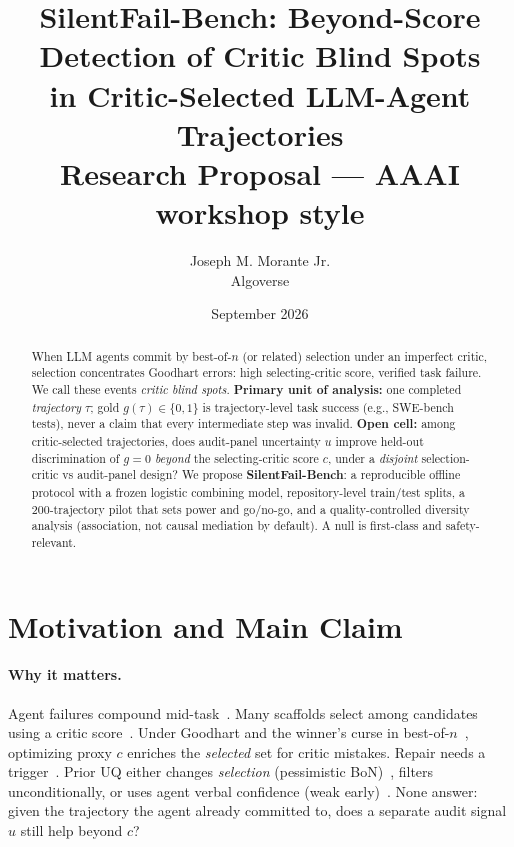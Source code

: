 \documentclass[11pt]{article}
\title{\textbf{SilentFail-Bench: Beyond-Score Detection of Critic Blind Spots\\[-2pt]
in Critic-Selected LLM-Agent Trajectories}\\[4pt]
\large Research Proposal --- AAAI workshop style}
\author{Joseph M. Morante Jr.\\Algoverse}
\date{September 2026}
\newcommand{\gzero}{g{=}0}
\begin{document}
\maketitle
\vspace{-1em}

\begin{abstract}
\noindent
When LLM agents commit by best-of-$n$ (or related) selection under an imperfect critic, selection concentrates Goodhart errors: high selecting-critic score, verified task failure.
We call these events \emph{critic blind spots}.
\textbf{Primary unit of analysis:} one completed \emph{trajectory} $\tau$; gold $g(\tau)\in\{0,1\}$ is trajectory-level task success (e.g., SWE-bench tests), never a claim that every intermediate step was invalid.
\textbf{Open cell:} among critic-selected trajectories, does audit-panel uncertainty $u$ improve held-out discrimination of $\gzero$ \emph{beyond} the selecting-critic score $c$, under a \emph{disjoint} selection-critic vs audit-panel design?
We propose \textbf{SilentFail-Bench}: a reproducible offline protocol with a frozen logistic combining model, repository-level train/test splits, a 200-trajectory pilot that sets power and go/no-go, and a quality-controlled diversity analysis (association, not causal mediation by default).
A null is first-class and safety-relevant.
\end{abstract}

\section{Motivation and Main Claim}

\paragraph{Why it matters.}
Agent failures compound mid-task~\cite{agentforesight,detectrepair,falsesuccess}.
Many scaffolds select among candidates using a critic score~\cite{lightman,mathshepherd,agentprm}.
Under Goodhart and the winner's curse in best-of-$n$~\cite{gao2023,inferencetimehacking,caution,minin}, optimizing proxy $c$ enriches the \emph{selected} set for critic mistakes.
Repair needs a trigger~\cite{reflexion}.
Prior UQ either changes \emph{selection} (pessimistic BoN)~\cite{coste,caution,urm}, filters unconditionally, or uses agent verbal confidence (weak early)~\cite{laststep}.
None answer: given the trajectory the agent already committed to, does a separate audit signal $u$ still help beyond $c$?
\end{document}
